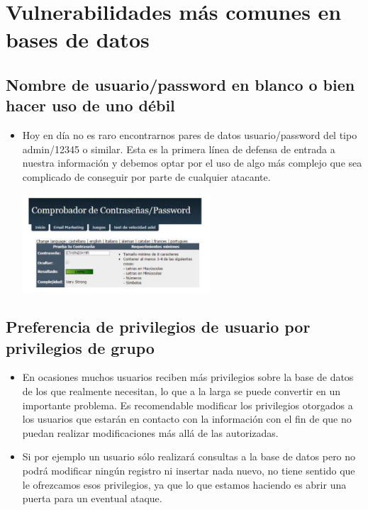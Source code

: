 \documentclass[%
 reprint,
 amsmath,amssymb,
 aps,
]{revtex4-1}
\begin{document}
\section{Vulnerabilidades más comunes en bases de datos}
\subsection{Nombre de usuario/password en blanco o bien hacer uso de uno débil}
\begin{itemize}
\item Hoy en día no es raro encontrarnos pares de datos usuario/password del tipo admin/12345 o similar. Esta es la primera línea de defensa de entrada a nuestra información y debemos optar por el uso de algo más complejo que sea complicado de conseguir por parte de cualquier atacante.
\begin{center}
	\includegraphics[width=7cm]{./Imagenes/login}
\end{center}	
\end{itemize}
\subsection{Preferencia de privilegios de usuario por privilegios de grupo}
\begin{itemize}
\item En ocasiones muchos usuarios reciben más privilegios sobre la base de datos de los que realmente
necesitan, lo que a la larga se puede convertir en un importante problema. Es recomendable modificar los
privilegios otorgados a los usuarios que estarán en contacto con la información con el fin de que no puedan
realizar modificaciones más allá de las autorizadas.
\item Si por ejemplo un usuario sólo realizará consultas a la base de datos pero no podrá modificar ningún
registro ni insertar nada nuevo, no tiene sentido que le ofrezcamos esos privilegios, ya que lo que estamos
haciendo es abrir una puerta para un eventual ataque.
\end{itemize}
\end{document}
